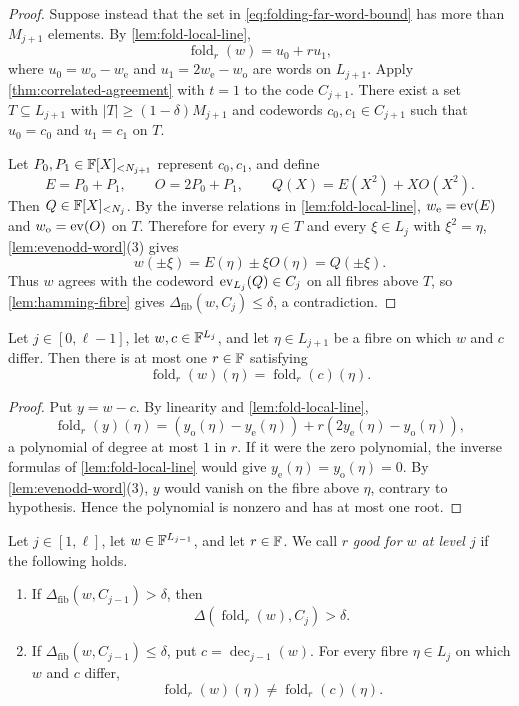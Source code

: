 \begin{proof}
Suppose instead that the set in \eqref{eq:folding-far-word-bound} has more than $M_{j+1}$ elements.  By \cref{lem:fold-local-line},
\[
  \operatorname{fold}_r(w)=u_0+ru_1,
\]
where $u_0=w_{\mathrm o}-w_{\mathrm e}$ and $u_1=2w_{\mathrm e}-w_{\mathrm o}$ are words on $L_{j+1}$.  Apply \cref{thm:correlated-agreement} with $t=1$ to the code $C_{j+1}$.  There exist a set $T\subseteq L_{j+1}$ with $|T|\ge(1-\delta)M_{j+1}$ and codewords $c_0,c_1\in C_{j+1}$ such that $u_0=c_0$ and $u_1=c_1$ on $T$.

Let $P_0,P_1\in\mathbb{F}[X]_{<N_{j+1}}$ represent $c_0,c_1$, and define
\[
  E=P_0+P_1,
  \qquad
  O=2P_0+P_1,
  \qquad
  Q(X)=E(X^2)+XO(X^2).
\]
Then $Q\in\mathbb{F}[X]_{<N_j}$.  By the inverse relations in \cref{lem:fold-local-line}, $w_{\mathrm e}=\operatorname{ev}(E)$ and $w_{\mathrm o}=\operatorname{ev}(O)$ on $T$.  Therefore for every $\eta\in T$ and every $\xi\in L_j$ with $\xi^2=\eta$, \cref{lem:evenodd-word}(3) gives
\[
  w(\pm\xi)=E(\eta)\pm\xi O(\eta)=Q(\pm\xi).
\]
Thus $w$ agrees with the codeword $\operatorname{ev}_{L_j}(Q)\in C_j$ on all fibres above $T$, so \cref{lem:hamming-fibre} gives $\Delta_{\mathrm{fib}}(w,C_j)\le\delta$, a contradiction.
\end{proof}

\begin{lemma}
\label{lem:fibre-error-survives}
Let $j\in[0,\ell-1]$, let $w,c\in\mathbb{F}^{L_j}$, and let $\eta\in L_{j+1}$ be a fibre on which $w$ and $c$ differ.  Then there is at most one $r\in\mathbb{F}$ satisfying
\[
  \operatorname{fold}_r(w)(\eta)
  =
  \operatorname{fold}_r(c)(\eta).
\]
\end{lemma}

\begin{proof}
Put $y=w-c$.  By linearity and \cref{lem:fold-local-line},
\[
  \operatorname{fold}_r(y)(\eta)
  =
  (y_{\mathrm o}(\eta)-y_{\mathrm e}(\eta))
  +r(2y_{\mathrm e}(\eta)-y_{\mathrm o}(\eta)),
\]
a polynomial of degree at most $1$ in $r$.  If it were the zero polynomial, the inverse formulas of \cref{lem:fold-local-line} would give $y_{\mathrm e}(\eta)=y_{\mathrm o}(\eta)=0$.  By \cref{lem:evenodd-word}(3), $y$ would vanish on the fibre above $\eta$, contrary to hypothesis.  Hence the polynomial is nonzero and has at most one root.
\end{proof}

\begin{definition}
\label{def:good-folding-challenge}
Let $j\in[1,\ell]$, let $w\in\mathbb{F}^{L_{j-1}}$, and let $r\in\mathbb{F}$.  We call $r$ \emph{good for $w$ at level $j$} if the following holds.
\begin{enumerate}[label=(\arabic*),leftmargin=*]
  \item If $\Delta_{\mathrm{fib}}(w,C_{j-1})>\delta$, then
  \[
    \Delta(\operatorname{fold}_r(w),C_j)>\delta.
  \]
  \item If $\Delta_{\mathrm{fib}}(w,C_{j-1})\le\delta$, put $c=\operatorname{dec}_{j-1}(w)$.  For every fibre $\eta\in L_j$ on which $w$ and $c$ differ,
  \[
    \operatorname{fold}_r(w)(\eta)
    \ne
    \operatorname{fold}_r(c)(\eta).
  \]
\end{enumerate}
\end{definition}

